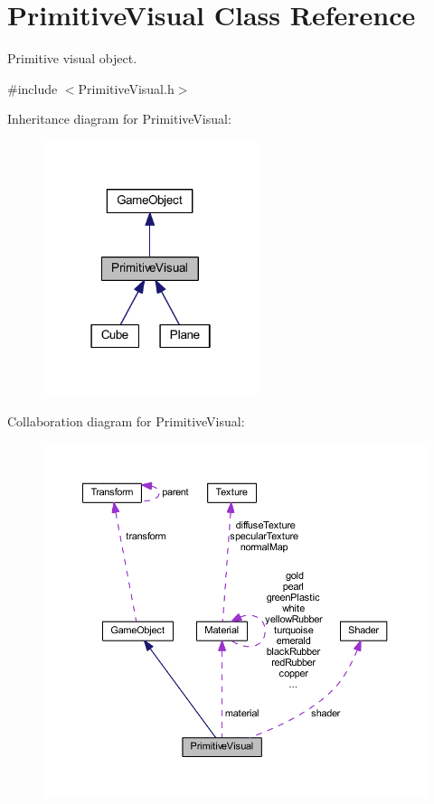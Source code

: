 \hypertarget{class_primitive_visual}{}\section{Primitive\+Visual Class Reference}
\label{class_primitive_visual}


Primitive visual object.  




{\ttfamily \#include $<$Primitive\+Visual.\+h$>$}



Inheritance diagram for Primitive\+Visual\+:
\nopagebreak
\begin{figure}[H]
\begin{center}
\leavevmode
\includegraphics[width=178pt]{class_primitive_visual__inherit__graph}
\end{center}
\end{figure}


Collaboration diagram for Primitive\+Visual\+:
\nopagebreak
\begin{figure}[H]
\begin{center}
\leavevmode
\includegraphics[width=350pt]{class_primitive_visual__coll__graph}
\end{center}
\end{figure}
